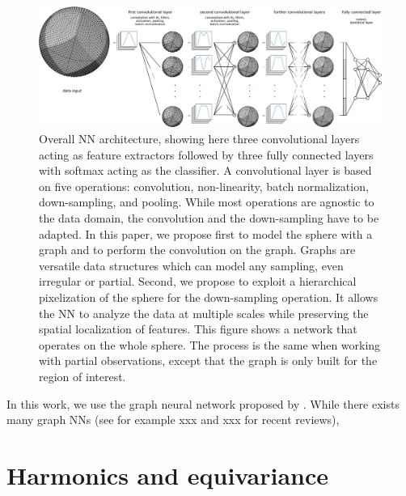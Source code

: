 \documentclass{article} %
\newcommand{\1}{\b{1}}              %
\newcommand{\0}{\b{0}}              %
\newcommand{\todo}[1]{{\color[rgb]{.6,.1,.6}{#1}}}
\begin{document}
\begin{figure}
	\centering
	\includegraphics[width=\linewidth]{figure_architecture_v3}
	\caption{Overall NN architecture, showing here three convolutional layers acting as feature extractors followed by three fully connected layers with softmax acting as the classifier.
    A convolutional layer is based on five operations: convolution, non-linearity, batch normalization, down-sampling, and pooling.
	While most operations are agnostic to the data domain, the convolution and the down-sampling have to be adapted.
	In this paper, we propose first to model the sphere with a graph and to perform the convolution on the graph.
	Graphs are versatile data structures which can model any sampling, even irregular or partial.
	Second, we propose to exploit a hierarchical pixelization of the sphere for the down-sampling operation.
	It allows the NN to analyze the data at multiple scales while preserving the spatial localization of features.
	This figure shows a network that operates on the whole sphere.
	The process is the same when working with partial observations, except that the graph is only built for the region of interest.}
	\label{fig:architecture}
\end{figure}


In this work, we use the graph neural network proposed by \citet{defferrard2016gnn}.
While there exists many graph NNs (see for example xxx and xxx for recent reviews),
\todo{Why this graph NN? We want an equivalence with the continuous world to prove equivariance to arbitrary rotations.}


\todo{Basics of GSP, how the graph is built, polynomial filters.}

\section{Harmonics and equivariance}
\end{document}
